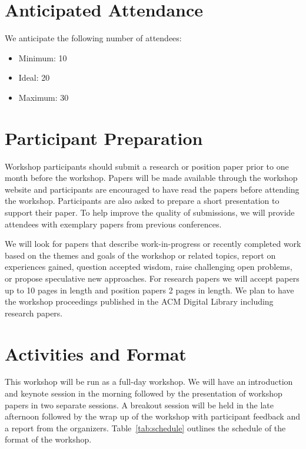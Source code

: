\documentclass{sigplanconf}
\begin{document}
\section{Anticipated Attendance}

We anticipate the following number of attendees:

\begin{itemize}
\item Minimum: 10 
\item Ideal: 20
\item Maximum: 30 
\end{itemize}

\section{Participant Preparation}\label{preparation}

Workshop participants should submit a research or position paper prior to one
month before the workshop. Papers will be made available
through the workshop website and participants are encouraged to have
read the papers before attending the workshop. Participants
are also asked to prepare a short presentation to support their
paper. To help improve the quality of submissions, 
we will provide attendees with exemplary papers
from previous conferences.



We will look for papers that describe work-in-progress or recently completed work based on the themes and goals of the workshop or related topics, report on experiences gained, question accepted wisdom, raise challenging open problems, or propose speculative new approaches. For research papers we will accept papers up to 10 pages in length and position papers 2 pages in length. We plan to have the workshop proceedings published in the ACM Digital Library including research papers.


\section{Activities and Format}

This workshop will be run as a full-day workshop.  We
will have an introduction and keynote session in the morning followed
by the presentation of workshop papers in two separate sessions. A breakout session will be held in the late afternoon followed by the wrap up of the workshop with participant feedback and a report from the organizers. Table~\ref{tab:schedule} outlines the schedule of the format of the workshop.
\end{document}
